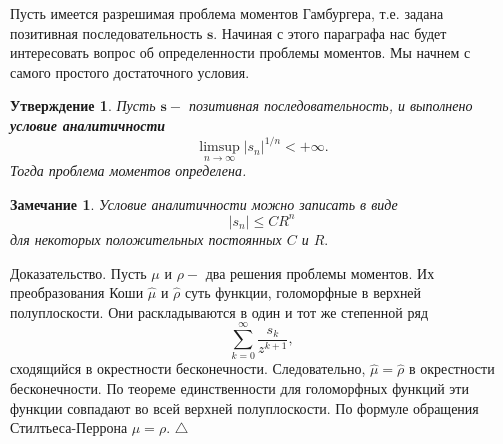 \documentclass[12 pt, a4 paper]{article}
\theoremstyle{plain}   \newtheorem{Pro}{Задача}
\newtheorem{Sta}{Утверждение}
\newtheorem{Rem}{Замечание}
\begin{document}
Пусть имеется разрешимая проблема моментов Гамбургера, т.е.
задана позитивная последовательность
$ \mathbf{s} . $
Начиная с этого параграфа нас будет интересовать вопрос об
определенности проблемы моментов. Мы начнем с самого простого
достаточного условия.
\begin{Sta}
Пусть
$ \mathbf{s} - $
позитивная последовательность, и выполнено
{\bfseries условие аналитичности}
$$
  \limsup _{n \rightarrow \infty }
  |s_n |^{1/n} < + \infty .
$$
Тогда проблема моментов определена.
\end{Sta}
\begin{Rem}
Условие аналитичности можно записать в виде
$$
  |s_n | \leq CR^n
$$
для некоторых положительных постоянных
$ C $
и
$ R . $
\end{Rem}
{\Large Доказательство.}
Пусть
$ \mu $
и
$ \rho - $
два решения проблемы моментов. Их преобразования Коши
$ \hat \mu $
и
$ \hat \rho $
суть функции, голоморфные в верхней полуплоскости.
Они раскладываются в один и тот же степенной ряд
$$
  \sum _{k=0}^{\infty}\frac{s_k}{z^{k+1}},
$$
сходящийся в окрестности бесконечности. Следовательно,
$ \hat \mu = \hat \rho $
в окрестности бесконечности. По теореме
единственности для голоморфных функций
эти функции совпадают во всей верхней полуплоскости.
По формуле обращения Стилтьеса-Перрона
$ \mu = \rho .$
$ \triangle $
\\
\end{document}

